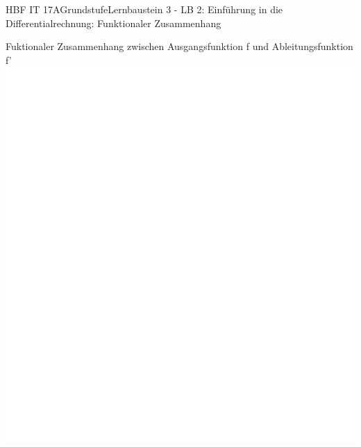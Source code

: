 \documentclass[oneside,openany,headings=optiontotoc,11pt,numbers=noenddot]{scrreprt}
\begin{document}
\begin{worksheet}{HBF IT 17A}{Grundstufe}{Lernbaustein 3 - LB 2: Einführung in die Differentialrechnung: Funktionaler Zusammenhang}
		\begin{framed}
			\noindent
			\tiny{\color{codegray}Fuktionaler Zusammenhang zwischen Ausgangsfunktion f und Ableitungsfunktion f'}\\
			\includegraphics[scale=0.42]{../empty.jpg}
		\end{framed}
	\end{worksheet}
\end{document}
